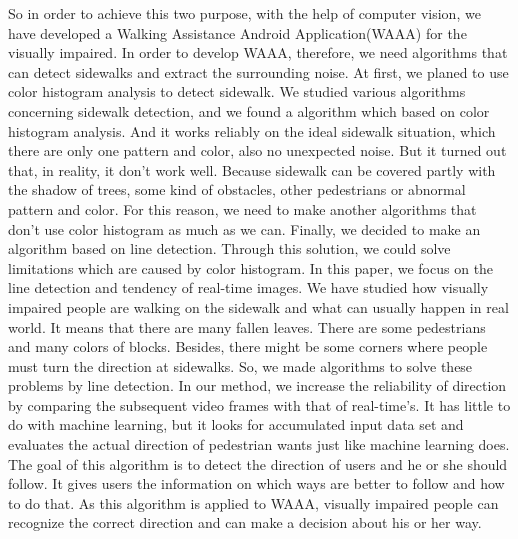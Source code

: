 \newline
So in order to achieve this two purpose, with the help of computer vision, we have developed a Walking Assistance Android Application(WAAA) for the visually impaired. In order to develop WAAA, therefore, we need algorithms that can detect sidewalks and extract the surrounding noise. At first, we planed to use color histogram analysis to detect sidewalk. We studied various algorithms concerning sidewalk detection, and we found a algorithm which based on color histogram analysis. And it works reliably on the ideal sidewalk situation, which there are only one pattern and color, also no unexpected noise. But it turned out that, in reality, it don’t work well. Because sidewalk can be covered partly with the shadow of trees, some kind of obstacles, other pedestrians or abnormal pattern and color. For this reason, we need to make another algorithms that don’t use color histogram as much as we can. Finally, we decided to make an algorithm based on line detection. Through this solution, we could solve limitations which are caused by color histogram.
\newline
In this paper, we focus on the line detection and tendency of real-time images. We have studied how visually impaired people are walking on the sidewalk and what can usually happen in real world. It means that there are many fallen leaves. There are some pedestrians and many colors of blocks. Besides, there might be some corners where people must turn the direction at sidewalks. So, we made algorithms to solve these problems by line detection.
\newline
In our method, we increase the reliability of direction by comparing the subsequent video frames with that of real-time's. It has little to do with machine learning, but it looks for accumulated input data set and evaluates the actual direction of pedestrian wants just like machine learning does. The goal of this algorithm is to detect the direction of users and he or she should follow. It gives users the information on which ways are better to follow and how to do that. As this algorithm is applied to WAAA, visually impaired people can recognize the correct direction and can make a decision about his or her way.